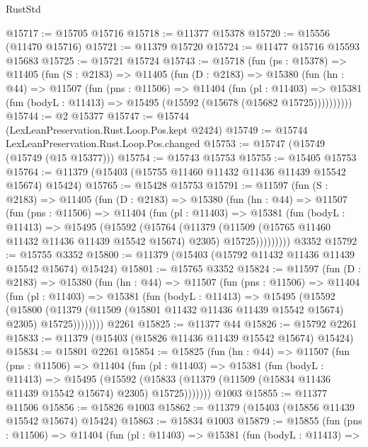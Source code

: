 \begin{lexlean}{RustStd}
\begin{coremodule}
@15717 := @15705 @15716
@15718 := @11377 @15378
@15720 := @15556 (@11470 @15716)
@15721 := @11379 @15720
@15724 := @11477 @15716 @15593 @15683
@15725 := @15721 @15724
@15743 := @15718
    (fun (ps : @15378) =>
    @11405
      (fun (S : @2183) =>
      @11405
        (fun (D : @2183) =>
        @15380
          (fun (hn : @44) =>
          @11507
            (fun (pns : @11506) =>
            @11404
              (fun (pl : @11403) =>
              @15381 (fun (bodyL : @11413) => @15495 (@15592 (@15678 (@15682 @15725))))))))))
@15744 := @2 @15377
@15747 := @15744 (LexLeanPreservation.Rust.Loop.Pos.kept @2424)
@15749 := @15744 LexLeanPreservation.Rust.Loop.Pos.changed
@15753 := @15747 (@15749 (@15749 (@15 @15377)))
@15754 := @15743 @15753
@15755 := @15405 @15753
@15764 := @11379 (@15403 (@15755 @11460 @11432 @11436 @11439 @15542 @15674) @15424)
@15765 := @15428 @15753
@15791 := @11597
    (fun (S : @2183) =>
    @11405
      (fun (D : @2183) =>
      @15380
        (fun (hn : @44) =>
        @11507
          (fun (pns : @11506) =>
          @11404
            (fun (pl : @11403) =>
            @15381
              (fun (bodyL : @11413) =>
              @15495
                (@15592
                  (@15764
                    (@11379
                      (@11509 (@15765 @11460 @11432 @11436 @11439 @15542 @15674) @2305)
                      @15725)))))))))
    @3352
@15792 := @15755 @3352
@15800 := @11379 (@15403 (@15792 @11432 @11436 @11439 @15542 @15674) @15424)
@15801 := @15765 @3352
@15824 := @11597
    (fun (D : @2183) =>
    @15380
      (fun (hn : @44) =>
      @11507
        (fun (pns : @11506) =>
        @11404
          (fun (pl : @11403) =>
          @15381
            (fun (bodyL : @11413) =>
            @15495
              (@15592
                (@15800
                  (@11379 (@11509 (@15801 @11432 @11436 @11439 @15542 @15674) @2305) @15725))))))))
    @2261
@15825 := @11377 @44
@15826 := @15792 @2261
@15833 := @11379 (@15403 (@15826 @11436 @11439 @15542 @15674) @15424)
@15834 := @15801 @2261
@15854 := @15825
    (fun (hn : @44) =>
    @11507
      (fun (pns : @11506) =>
      @11404
        (fun (pl : @11403) =>
        @15381
          (fun (bodyL : @11413) =>
          @15495
            (@15592
              (@15833 (@11379 (@11509 (@15834 @11436 @11439 @15542 @15674) @2305) @15725)))))))
    @1003
@15855 := @11377 @11506
@15856 := @15826 @1003
@15862 := @11379 (@15403 (@15856 @11439 @15542 @15674) @15424)
@15863 := @15834 @1003
@15879 := @15855
    (fun (pns : @11506) =>
    @11404
      (fun (pl : @11403) =>
      @15381
        (fun (bodyL : @11413) =>

\end{coremodule}
\end{lexlean}
